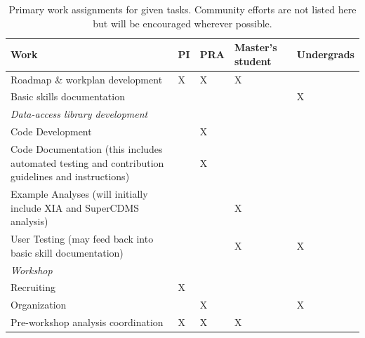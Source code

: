 \begin{table}
\begin{tabularx}{\textwidth}{>{\hsize=1.5\hsize}X
                             >{\hsize=0.4\hsize}X
                             >{\hsize=0.4\hsize}X
                             >{\hsize=0.4\hsize}X
                             >{\hsize=0.5\hsize}X}
\toprule
                             Work & PI & PRA & Master's student & Undergrads\\
\midrule
Roadmap \& workplan development
& X & X & X & \\

Basic skills documentation 
& & & & X\\
\addlinespace[2mm]

\textit{Data-access library development}
& \\
\midrule
Code Development 
& & X & &\\

Code Documentation (this includes automated testing and contribution guidelines and instructions)
& & X & &\\

Example Analyses (will initially include XIA and SuperCDMS analysis)
& & & X &\\

User Testing (may feed back into basic skill documentation)
& & & X & X\\
\addlinespace[2mm]

\textit{Workshop}
& \\
\midrule
Recruiting
& X & & &\\
Organization
& & X & & X\\
Pre-workshop analysis coordination
& X & X & X & \\

\bottomrule
\end{tabularx}
\caption{Primary work assignments for given tasks.  Community efforts are not listed here but will be encouraged wherever possible.}
\label{tab:WBS}
\end{table}

